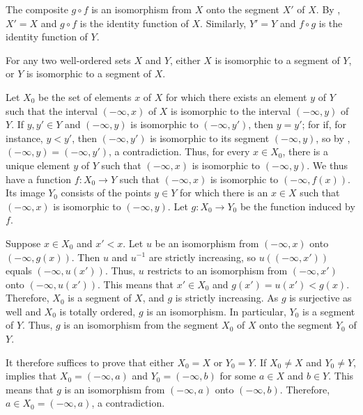 \documentclass{article}
\begin{document}
The composite \(g \circ f\) is an isomorphism from \(X\) onto the
segment \(X'\) of \(X\).  By , \(X' = X\) and
\(g \circ f\) is the identity function of \(X\).  Similarly,
\(Y' = Y\) and \(f \circ g\) is the identity function of \(Y\).

\begin{theorem}
  \label{thm:vy95iuyi}
  For any two well-ordered sets \(X\) and \(Y\), either \(X\) is
  isomorphic to a segment of \(Y\), or \(Y\) is isomorphic to a
  segment of \(X\).
\end{theorem}

Let \(X_0\) be the set of elements \(x\) of \(X\) for which there
exists an element \(y\) of \(Y\) such that the interval
\((-\infty, x)\) of \(X\) is isomorphic to the interval
\((-\infty, y)\) of \(Y\).  If \(y, y' \in Y\) and \((-\infty, y)\) is
isomorphic to \((-\infty, y')\), then \(y = y'\); for if, for
instance, \(y < y'\), then \((-\infty, y')\) is isomorphic to its
segment \((-\infty, y)\), so by ,
\((-\infty, y) = (-\infty, y')\), a contradiction.  Thus, for every
\(x \in X_0\), there is a unique element \(y\) of \(Y\) such that
\((-\infty, x)\) is isomorphic to \((-\infty, y)\).  We thus have a
function \(f : X_0 \to Y\) such that \((-\infty, x)\) is isomorphic to
\((-\infty, f(x))\).  Its image \(Y_0\) consists of the points
\(y \in Y\) for which there is an \(x \in X\) such that
\((-\infty, x)\) is isomorphic to \((-\infty, y)\).  Let
\(g : X_0 \to Y_0\) be the function induced by \(f\).

Suppose \(x \in X_0\) and \(x' < x\).  Let \(u\) be an isomorphism
from \((-\infty, x)\) onto \((-\infty, g(x))\).  Then \(u\) and
\(u^{-1}\) are strictly increasing, so \(u((-\infty, x'))\) equals
\((-\infty, u(x'))\).  Thus, \(u\) restricts to an isomorphism from
\((-\infty, x')\) onto \((-\infty, u(x'))\).  This means that
\(x' \in X_0\) and \(g(x') = u(x') < g(x)\).  Therefore, \(X_0\) is a
segment of \(X\), and \(g\) is strictly increasing.  As \(g\) is
surjective as well and \(X_0\) is totally ordered, \(g\) is an
isomorphism.  In particular, \(Y_0\) is a segment of \(Y\).  Thus,
\(g\) is an isomorphism from the segment \(X_0\) of \(X\) onto the
segment \(Y_0\) of \(Y\).

It therefore suffices to prove that either \(X_0 = X\) or \(Y_0 = Y\).
If \(X_0 \neq X\) and \(Y_0 \neq Y\),  implies that
\(X_0 = (-\infty, a)\) and \(Y_0 = (-\infty, b)\) for some \(a \in X\)
and \(b \in Y\).  This means that \(g\) is an isomorphism from
\((-\infty, a)\) onto \((-\infty, b)\).  Therefore,
\(a \in X_0 = (-\infty, a)\), a contradiction.
\end{document}
